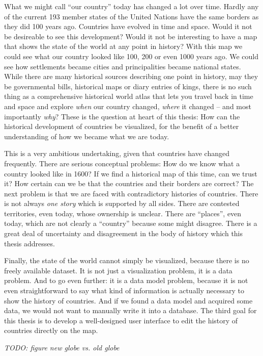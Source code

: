 What we might call ``our country'' today has changed a lot over time. Hardly any of the current 193 member states of the United Nations have the same borders as they did 100 years ago. Countries have evolved in time and space. Would it not be desireable to see this development? Would it not be interesting to have a map that shows the state of the world at any point in history? With this map we could see what our country looked like 100, 200 or even 1000 years ago. We could see how settlements became cities and principalities became national states. While there are many historical sources describing one point in history, may they be governmental bills, historical maps or diary entries of kings, there is no such thing as a comprehensive historical world atlas that lets you travel back in time and space and explore \emph{when} our country changed, \emph{where} it changed -- and most importantly \emph{why}? These is the question at heart of this thesis: How can the historical development of countries be visualized, for the benefit of a better understanding of how we became what we are today.

This is a very ambitious undertaking, given that countries have changed frequently. There are serious conceptual problems: How do we know what a country looked like in 1600? If we find a historical map of this time, can we trust it? How certain can we be that the countries and their borders are correct? The next problem is that we are faced with contradictory histories of countries. There is not always \emph{one story} which is supported by all sides. There are contested territories, even today, whose ownership is unclear. There are ``places'', even today, which are not clearly a ``country'' because some might disagree. There is a great deal of uncertainty and disagreement in the body of history which this thesis addresses.

Finally, the state of the world cannot simply be visualized, because there is no freely available dataset. It is not just a visualization problem, it is a data problem. And to go even further: it is a data model problem, because it is not even straightforward to say what kind of information is actually necessary to show the history of countries. And if we found a data model and acquired some data, we would not want to manually write it into a database. The third goal for this thesis is to develop a well-designed user interface to edit the history of countries directly on the map.

\emph{TODO: figure new globe vs. old globe}

